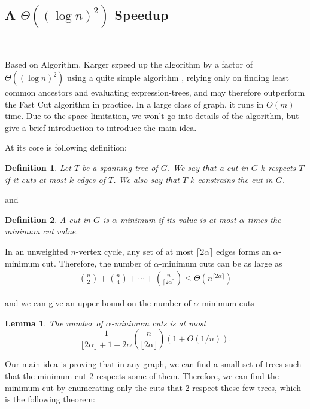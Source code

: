 \documentclass[12pt]{article}
\theoremstyle{plain}
\newtheorem{lemma}{Lemma}[section]
\newtheorem{definition}{Definition}[section]
\begin{document}
\subsection{A \texorpdfstring{$\Theta((\log n)^2)$}{ } Speedup}\

Based on Algorithm, Karger szpeed up the algorithm by a factor of $\Theta((\log n)^2)$ using a quite simple algorithm \cite{karger2000minimum}, relying only on finding least common ancestors and evaluating expression-trees, and may
therefore outperform the Fast Cut algorithm in practice. In a large class of graph, it runs in $O(m)$ time. Due to the space limitation, we won't go into details of the algorithm, but give a brief introduction to introduce the main idea.

At its core is following definition:

\begin{definition}
    Let $T$ be a spanning tree of $G$. We say that a cut in $G$ $k$-respects $T$ if it cuts at most $k$ edges of $T$. We also say that $T$ $k$-constrains the cut in $G$.
\end{definition}

and 

\begin{definition}
    A cut in $G$ is $\alpha$-minimum if its value is at most
    $\alpha$ times the minimum cut value.
\end{definition}

In an unweighted $n$-vertex cycle, any set of at most $\lceil 2\alpha\rceil$ edges forms an $\alpha$-minimum cut. Therefore, the number of $\alpha$-minimum cuts can be as large as
\begin{align*}
    \binom{n}{2}+\binom{n}{4}+\cdots+\binom{n}{\lceil 2\alpha\rceil}\leq \Theta(n^{\lceil 2\alpha\rceil})
\end{align*}

and we can give an upper bound on the number of $\alpha$-minimum cuts

\begin{lemma}
    The number of $\alpha$-minimum cuts is at most
  \[
  \frac{1}{\lfloor 2\alpha \rfloor + 1 -2\alpha} \binom{n}{\lfloor
      2\alpha \rfloor}(1+O(1/n)).
  \]
\end{lemma} 

Our main idea is proving that in any graph, we can find a small set of trees such that the minimum cut 2-respects some of them. Therefore, we can find the minimum cut by enumerating only the cuts that 2-respect these few trees, which is the following theorem:
\end{document}

